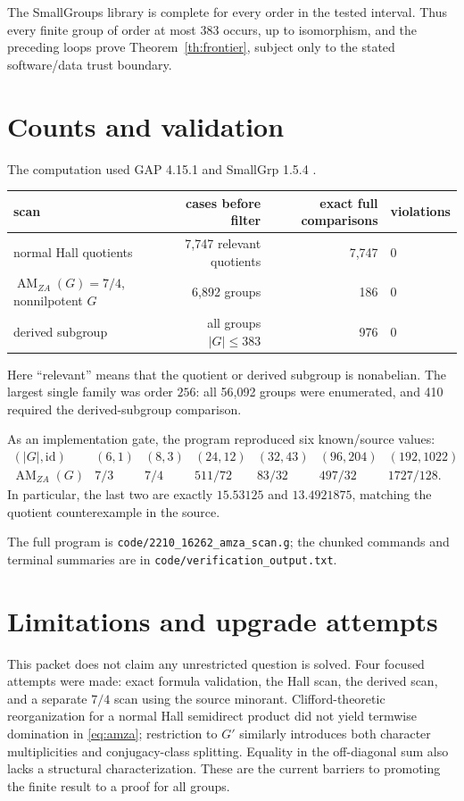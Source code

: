 \documentclass[11pt]{article}
\newcommand{\AM}{\operatorname{AM}_{ZA}}
\begin{document}
The SmallGroups library is complete for every order in the tested interval.
Thus every finite group of order at most $383$ occurs, up to isomorphism, and
the preceding loops prove Theorem~\ref{th:frontier}, subject only to the stated
software/data trust boundary.

\section{Counts and validation}

The computation used GAP 4.15.1 and SmallGrp 1.5.4 \cite{GAP,SmallGrp}.

\begin{center}
\begin{tabular}{@{}lrrl@{}}
\toprule
scan & cases before filter & exact full comparisons & violations \\
\midrule
normal Hall quotients & 7,747 relevant quotients & 7,747 & 0 \\
$\AM(G)=7/4$, nonnilpotent $G$ & 6,892 groups & 186 & 0 \\
derived subgroup & all groups $|G|\leq383$ & 976 & 0 \\
\bottomrule
\end{tabular}
\end{center}

Here ``relevant'' means that the quotient or derived subgroup is nonabelian.
The largest single family was order $256$: all 56,092 groups were enumerated,
and 410 required the derived-subgroup comparison.

As an implementation gate, the program reproduced six known/source values:
\[
\begin{array}{c|cccccc}
(|G|,\mathrm{id})&(6,1)&(8,3)&(24,12)&(32,43)&(96,204)&(192,1022)\\
\hline
\AM(G)&7/3&7/4&511/72&83/32&497/32&1727/128.
\end{array}
\]
In particular, the last two are exactly $15.53125$ and $13.4921875$, matching
the quotient counterexample in the source.

The full program is \texttt{code/2210\_16262\_amza\_scan.g}; the chunked
commands and terminal summaries are in
\texttt{code/verification\_output.txt}.

\section{Limitations and upgrade attempts}

This packet does not claim any unrestricted question is solved.  Four focused
attempts were made: exact formula validation, the Hall scan, the derived scan,
and a separate $7/4$ scan using the source minorant.  Clifford-theoretic
reorganization for a normal Hall semidirect product did not yield termwise
domination in \eqref{eq:amza}; restriction to $G'$ similarly introduces both
character multiplicities and conjugacy-class splitting.  Equality in the
off-diagonal sum also lacks a structural characterization.  These are the
current barriers to promoting the finite result to a proof for all groups.
\end{document}

